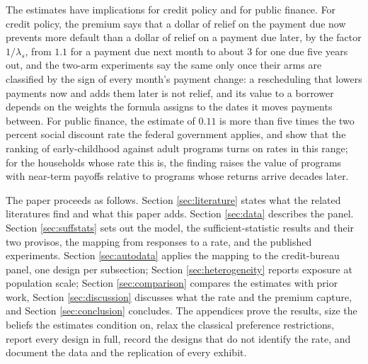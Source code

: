 The estimates have implications for credit policy and for public finance. For credit policy, the premium says that a dollar of relief on the payment due now prevents more default than a dollar of relief on a payment due later, by the factor $1/\lambda_s$, from $1.1$ for a payment due next month to about $3$ for one due five years out, and the two-arm experiments say the same only once their arms are classified by the sign of every month's payment change: a rescheduling that lowers payments now and adds them later is not relief, and its value to a borrower depends on the weights the formula assigns to the dates it moves payments between. For public finance, the estimate of $0.11$ is more than five times the two percent social discount rate the federal government applies, and \citet{hendren_unified_2020} show that the ranking of early-childhood against adult programs turns on rates in this range; for the households whose rate this is, the finding raises the value of programs with near-term payoffs relative to programs whose returns arrive decades later.

The paper proceeds as follows. Section \ref{sec:literature} states what the related literatures find and what this paper adds. Section \ref{sec:data} describes the panel. Section \ref{sec:suffstats} sets out the model, the sufficient-statistic results and their two provisos, the mapping from responses to a rate, and the published experiments. Section \ref{sec:autodata} applies the mapping to the credit-bureau panel, one design per subsection; Section \ref{sec:heterogeneity} reports exposure at population scale; Section \ref{sec:comparison} compares the estimates with prior work, Section \ref{sec:discussion} discusses what the rate and the premium capture, and Section \ref{sec:conclusion} concludes. The appendices prove the results, size the beliefs the estimates condition on, relax the classical preference restrictions, report every design in full, record the designs that do not identify the rate, and document the data and the replication of every exhibit.
